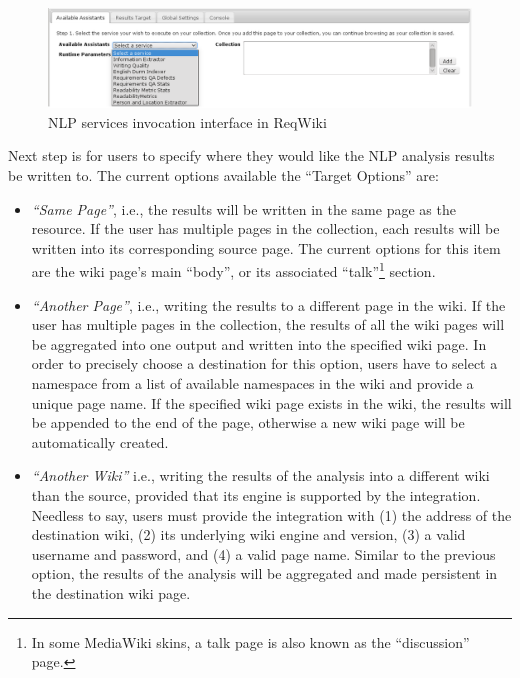 \documentclass[10pt,twoside,openany,bibtotoc,liststotoc]{scrbook}
\newcommand{\blankline}{\vspace{5mm}}
\begin{document}
\begin{figure}[h!]
\centering
\includegraphics[width=\textwidth]{reqwiki-sa}
\caption{NLP services invocation interface in ReqWiki}
\label{fig:reqwiki_sa}
\end{figure}

\blankline
Next step is for users to specify where they would like the NLP analysis results be written to. The current options available the ``Target Options'' are:

\begin{itemize}
\item \emph{``Same Page''}, i.e., the results will be written in the same page as the resource. If the user has multiple pages in the collection, each results will be written into its corresponding source page. The current options for this item are the wiki page's main ``body'', or its associated ``talk''\footnote{In some MediaWiki skins, a talk page is also known as the ``discussion'' page.} section.
\item \emph{``Another Page''}, i.e., writing the results to a different page in the wiki. If the user has multiple pages in the collection, the results of all the wiki pages will be aggregated into one output and written into the specified wiki page. In order to precisely choose a destination for this option, users have to select a namespace from a list of available namespaces in the wiki and provide a unique page name. If the specified wiki page exists in the wiki, the results will be appended to the end of the page, otherwise a new wiki page will be automatically created.
\item \emph{``Another Wiki''} i.e., writing the results of the analysis into a different wiki than the source, provided that its engine is supported by the integration. Needless to say, users must provide the integration with (1) the address of the destination wiki, (2) its underlying wiki engine and version, (3) a valid username and password, and (4) a valid page name. Similar to the previous option, the results of the analysis will be aggregated and made persistent in the destination wiki page.
\end{itemize}
\end{document}
